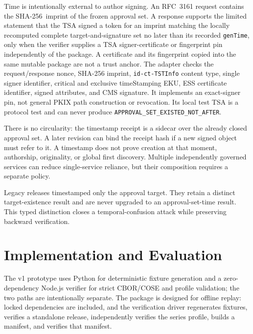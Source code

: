\documentclass[acmsmall,screen,review,nonacm]{acmart}
\newcommand{\sha}{\textsf{SHA-256}}
\begin{document}
Time is intentionally external to author signing. An RFC~3161 request contains
the \sha\ imprint of the frozen approval set. A response supports the limited
statement that the TSA signed a token for an imprint matching the locally
recomputed complete target-and-signature set no later than its recorded
\texttt{genTime}, only when the verifier supplies a TSA signer-certificate or
fingerprint pin independently of the package. A certificate and its fingerprint
copied into the same mutable package are not a trust anchor. The adapter checks
the request/response nonce, SHA-256 imprint, \texttt{id-ct-TSTInfo} content type,
single signer identifier, critical and exclusive timeStamping EKU, ESS
certificate identifier, signed attributes, and CMS signature. It implements an
exact-signer pin, not general PKIX path construction or revocation. Its local
test TSA is a protocol test and can never produce
\texttt{APPROVAL\_SET\_EXISTED\_NOT\_AFTER}.

There is no circularity: the timestamp receipt is a sidecar over the already
closed approval set. A later revision can bind the receipt hash if a new signed object
must refer to it. A timestamp does not prove creation at that moment,
authorship, originality, or global first discovery. Multiple independently
governed services can reduce single-service reliance, but their composition
requires a separate policy.

Legacy releases timestamped only the approval target. They retain a distinct
target-existence result and are never upgraded to an approval-set-time result.
This typed distinction closes a temporal-confusion attack while preserving
backward verification.

\section{Implementation and Evaluation}

The v1 prototype uses Python for deterministic fixture generation and a zero-dependency Node.js verifier for strict CBOR/COSE and profile validation; the two paths are intentionally separate. The package is designed for offline replay: locked dependencies are included, and the verification driver regenerates fixtures, verifies a standalone release, independently verifies the series profile, builds a manifest, and verifies that manifest.
\end{document}
